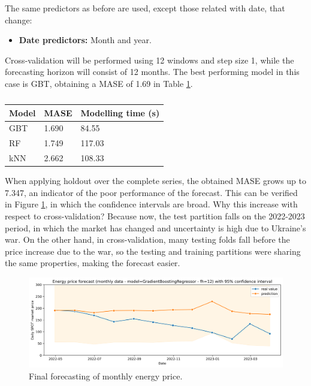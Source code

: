 \noindent The same predictors as before are used, except those related with date, that change:
\begin{itemize}
    \item \textbf{Date predictors:} Month and year.
\end{itemize}

Cross-validation will be performed using 12 windows and step size 1, while the forecasting horizon will consist of 12 months. The best performing model in this case is GBT, obtaining a MASE of 1.69 in Table \ref{tab:cv-monthly}.

\begin{table}[H]
\centering
\begin{tabular}{@{}l|l|l@{}}
\toprule
Model & MASE  & Modelling time (s)  \\ \midrule
GBT   & 1.690  & 84.55    \\
RF    & 1.749  & 117.03   \\
kNN   & 2.662  & 108.33   \\ \bottomrule
\end{tabular}
\caption{}
\label{tab:cv-monthly}
\end{table}

When applying holdout over the complete series, the obtained MASE grows up to 7.347, an indicator of the poor performance of the forecast. This can be verified in Figure \ref{fig:forecast-monthly}, in which the confidence intervals are broad. Why this increase with respect to cross-validation? Because now, the test partition falls on the 2022-2023 period, in which the market has changed and uncertainty is high due to Ukraine's war. On the other hand, in cross-validation, many testing folds fall before the price increase due to the war, so the testing and training partitions were sharing the same properties, making the forecast easier.

\begin{figure}[H]
\centering
    \caption{Final forecasting of monthly energy price.}
    \label{fig:forecast-monthly}
    \includegraphics[scale=0.4]{images/analysis/forecast-monthly}
\end{figure}

